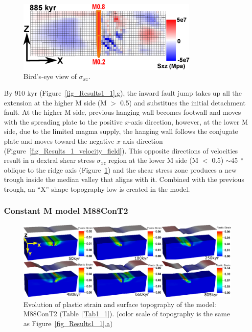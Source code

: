 \begin{figure}[h]
  \centering
    \includegraphics[width=0.8\textwidth]{./Figures/fig_Results_1_Sxz.eps}
  \caption{Bird's-eye view of $\sigma_{xz}$.}
 \label{fig_Results_1_Sxz}
\end{figure}

By 910 kyr (Figure~\hyperref[fig_Results1_1]{\ref{fig_Results1_1}.g}), the inward fault jump takes up all the extension at the higher M side (M $>$ 0.5) and substitues the initial detachment fault. At the higher M side, previous hanging wall becomes footwall and moves with the spreading plate to the positive $x$-axis direction, however, at the lower M side, due to the limited magma supply, the hanging wall follows the conjugate plate and moves toward the negative $x$-axis direction (Figure~\hyperref[fig_Results_1_velocity_field]{\ref{fig_Results_1_velocity_field}}). This opposite directions of velocities result in a dextral shear stress $\sigma_{xz}$ region at the lower M side (M $<$ 0.5) $\sim$45 $\degree$ oblique to the ridge axis (Figure~\hyperref[fig_Results_1_Sxz]{\ref{fig_Results_1_Sxz}}) and the shear stress zone produces a new trough inside the median valley that aligns with it. Combined with the previous trough, an ``X'' shape topography low is created in the model.

\subsubsection{Constant M model M88ConT2}

\begin{figure}[h]
  \centering
    \includegraphics[width=1.0\textwidth]{./Figures/fig_Results1_3.eps}
  \caption{Evolution of plastic strain and surface topography of the model: M88ConT2 (Table~\hyperref[Tab1_1]{\ref{Tab1_1}}). (color scale of topography is the same as Figure~\hyperref[fig_Results1_1]{\ref{fig_Results1_1}.a})}
 \label{fig_Results1_3}
\end{figure}   

